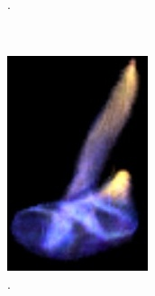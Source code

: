 \begin{figure}[htpb!]
\begin{subfigure}[t]{0.106\textwidth}
                \caption{\cite{Hasinoff:2003}.}
        \end{subfigure}  
        ~ %
        \begin{subfigure}[t]{0.19\textwidth}
                \includegraphics[width=\textwidth]{img/ihrke_2004}
                \caption{\cite{Ihrke:2004}.}
        \end{subfigure}      
        ~ %
        \begin{subfigure}[t]{0.29\textwidth}

\end{subfigure}
\end{figure}
